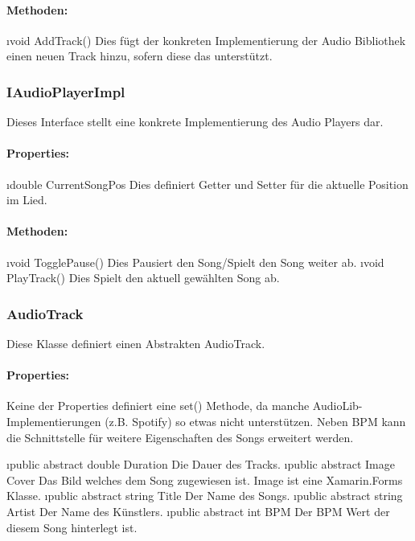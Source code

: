 \documentclass[../entwurf.tex]{subfiles}
\begin{document}
				\paragraph{Methoden:}
					\begin{itemize}
						\i{void AddTrack()} Dies fügt der konkreten Implementierung der Audio Bibliothek einen neuen Track hinzu, sofern
						diese das unterstützt.
					\end{itemize}
			\subsubsection{IAudioPlayerImpl}
				Dieses Interface stellt eine konkrete Implementierung des Audio Players dar.
				\paragraph{Properties:}
					\begin{itemize}
						\i{double CurrentSongPos} Dies definiert Getter und Setter für die aktuelle Position im Lied.
					\end{itemize}
				\paragraph{Methoden:}
					\begin{itemize}
						\i{void TogglePause()} Dies Pausiert den Song/Spielt den Song weiter ab.
						\i{void PlayTrack()} Dies Spielt den aktuell gewählten Song ab.
					\end{itemize}
			\subsubsection{AudioTrack}
				Diese Klasse definiert einen Abstrakten AudioTrack.
				\paragraph{Properties:}
					Keine der Properties definiert eine set() Methode, da manche AudioLib-Implementierungen (z.B. Spotify) so etwas nicht
					unterstützen. Neben BPM kann die Schnittstelle für weitere Eigenschaften des Songs erweitert werden.
					\begin{itemize}
						\i{public abstract double Duration} Die Dauer des Tracks.
						\i{public abstract Image Cover} Das Bild welches dem Song zugewiesen ist. Image ist eine Xamarin.Forms Klasse.
						\i{public abstract string Title} Der Name des Songs.
						\i{public abstract string Artist} Der Name des Künstlers.
						\i{public abstract int BPM} Der BPM Wert der diesem Song hinterlegt ist.
					\end{itemize}
\end{document}

